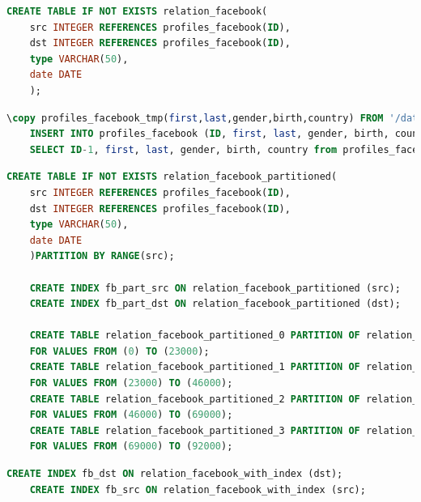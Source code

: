 \begin{lstlisting}[language=SQL,caption=Anlegen der Tabelle facebook-relation,frame=single, label={2.relationFacebook.listing}]
    CREATE TABLE IF NOT EXISTS relation_facebook(
    src INTEGER REFERENCES profiles_facebook(ID),
    dst INTEGER REFERENCES profiles_facebook(ID),
    type VARCHAR(50),
    date DATE
    );
\end{lstlisting}

\begin{lstlisting}[language=SQL,caption=Hinzufügen von Fremdschlüsseln,frame=single, label={2.foreignKey.listing}]
    \copy profiles_facebook_tmp(first,last,gender,birth,country) FROM '/data/WS2018/facebook-profiles' DELIMITER ',' CSV HEADER;
    INSERT INTO profiles_facebook (ID, first, last, gender, birth, country)
    SELECT ID-1, first, last, gender, birth, country from profiles_facebook_tmp;
\end{lstlisting}

\begin{lstlisting}[language=SQL,caption=Erstellen von partitionierten Tabellen mit Index facebook,frame=single, label={2.parttableindexfacebook.listing}]
    CREATE TABLE IF NOT EXISTS relation_facebook_partitioned(
    src INTEGER REFERENCES profiles_facebook(ID),
    dst INTEGER REFERENCES profiles_facebook(ID),
    type VARCHAR(50),
    date DATE
    )PARTITION BY RANGE(src);

    CREATE INDEX fb_part_src ON relation_facebook_partitioned (src);
    CREATE INDEX fb_part_dst ON relation_facebook_partitioned (dst);

    CREATE TABLE relation_facebook_partitioned_0 PARTITION OF relation_facebook_partitioned
    FOR VALUES FROM (0) TO (23000);
    CREATE TABLE relation_facebook_partitioned_1 PARTITION OF relation_facebook_partitioned
    FOR VALUES FROM (23000) TO (46000);
    CREATE TABLE relation_facebook_partitioned_2 PARTITION OF relation_facebook_partitioned
    FOR VALUES FROM (46000) TO (69000);
    CREATE TABLE relation_facebook_partitioned_3 PARTITION OF relation_facebook_partitioned
    FOR VALUES FROM (69000) TO (92000);
\end{lstlisting}

\begin{lstlisting}[language=SQL,caption=Erstellen von Indexen auf relation Tabelle facebook,frame=single, label={2.indexfacebook.listing}]
    CREATE INDEX fb_dst ON relation_facebook_with_index (dst);
    CREATE INDEX fb_src ON relation_facebook_with_index (src);
\end{lstlisting}

